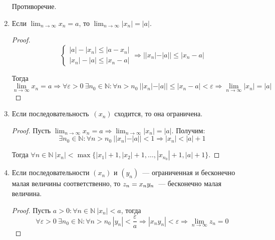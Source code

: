 \begin{enumerate}
\begin{proofcontra}
	Противоречие.
	\end{proofcontra}
	
	\item Если $\displaystyle \lim_{n \to \infty} x_n = a$, то $\displaystyle \lim_{n \to \infty} |x_n| = |a|$.
	\begin{proof}
	\begin{equation*}
	\begin{cases}
	|a| - |x_n| \leqslant |a - x_n| \\
	|x_n| - |a| \leqslant |x_n - a|
	\end{cases}
	\Rightarrow ||x_n| - |a|| \leqslant |x_n - a|
	\end{equation*}
	
	Тогда
	\begin{equation*}
	\lim_{n \to \infty} x_n = a \Rightarrow
	\forall \varepsilon > 0 \ \exists n_0 \in \mathbb N \colon \forall n > n_0 \ ||x_n| - |a|| \leqslant |x_n - a| < \varepsilon \Rightarrow
	\lim_{n \to \infty} |x_n| = |a|
	\end{equation*}
	\end{proof}
	
	\item Если последовательность~$(x_n)$ сходится, то она ограничена.
	\begin{proof}
	Пусть $\displaystyle \lim_{n \to \infty} x_n = a \Rightarrow \lim_{n \to \infty} |x_n| = |a|$.
	Получим:
	\begin{equation*}
	\exists n_0 \in \mathbb N \colon \forall n > n_0 \ ||x_n| - |a|| < 1 \Rightarrow |x_n| < |a| + 1
	\end{equation*}
	
	Тогда $\forall n \in \mathbb N \ |x_n| < \max \{ |x_1| + 1, |x_2| + 1, \ldots, |x_{n_0}| + 1, |a| + 1 \}$.
	\end{proof}
	
	\item Если последовательности $(x_n)$ и $(y_n)$~--- ограниченная и бесконечно малая величины соответственно, то $z_n \opbr= x_n y_n$~--- бесконечно малая величина.
	\begin{proof}
	Пусть $a > 0 \colon \forall n \in \mathbb N \ |x_n| < a$, тогда
	\begin{equation*}
	\forall \varepsilon > 0 \ \exists n_0 \in \mathbb N \colon
	\forall n > n_0 \ |y_n| < \frac\varepsilon{a} \Rightarrow
	|x_n y_n| < \varepsilon \Rightarrow
	\lim_{n \to \infty} z_n = 0
	\end{equation*}
	\end{proof}
	

\end{enumerate}
